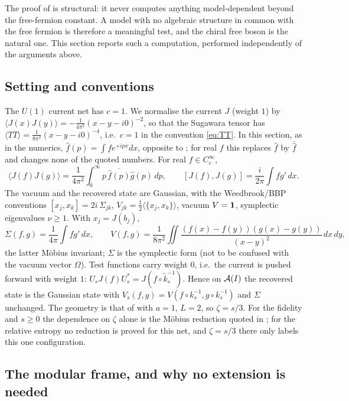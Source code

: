 The proof of  is structural: it never computes anything model-dependent beyond the free-fermion
constant.  A model with no algebraic structure in common with the free fermion is therefore a meaningful
test, and the chiral free boson is the natural one.  This section reports such a computation, performed
independently of the arguments above.

\subsection{Setting and conventions}

The $U(1)$ current net has $c=1$.  We normalise the current $J$ (weight $1$) by
$\langle J(x)J(y)\rangle=-\frac{1}{4\pi^{2}}(x-y-i0)^{-2}$, so that the Sugawara tensor has
$\langle TT\rangle=\frac{1}{8\pi^{2}}(x-y-i0)^{-4}$, i.e.\ $c=1$ in the convention \eqref{eq:TT}.  In this section, as in the numerics, $\hat f(p)=\int fe^{+ipx}dx$,
opposite to ; for real $f$ this replaces $\hat f$ by $\overline{\hat f}$ and changes none of the
quoted numbers.  For real
$f\in C_{c}^{\infty}$,
\[
 \langle J(f)J(g)\rangle=\frac{1}{4\pi^{2}}\int_{0}^{\infty}p\,\overline{\hat f(p)}\hat g(p)\,dp,
 \qquad [J(f),J(g)]=\frac{i}{2\pi}\int f g'\,dx .
\]
The vacuum and the recovered state are Gaussian, with the Weedbrook/BBP conventions
$[x_{j},x_{k}]=2i\,\Sigma_{jk}$, $V_{jk}=\frac12\langle\{x_{j},x_{k}\}\rangle$, vacuum $V=\mathbf 1$,
symplectic eigenvalues $\nu\ge1$.  With $x_{j}=J(b_{j})$,
\[
 \Sigma(f,g)=\frac{1}{4\pi}\int fg'\,dx,\qquad
 V(f,g)=\frac{1}{8\pi^{2}}\iint\frac{(f(x)-f(y))(g(x)-g(y))}{(x-y)^{2}}\,dx\,dy,
\]
the latter M\"obius invariant; $\Sigma$ is the symplectic form (not to be confused with the vacuum vector $\Omega$).  Test functions carry weight $0$, i.e.\ the current is pushed forward with
weight $1$: $U_{s}J(f)U_{s}^{*}=J(f\circ\tilde k_{s}^{-1})$.  Hence on $\mathcal A(I)$ the recovered state is the
Gaussian state with $V_{s}(f,g)=V(f\circ k_{s}^{-1},g\circ k_{s}^{-1})$ and $\Sigma$ unchanged.  The
geometry is that of  with $a=1$, $L=2$, so $\zeta=s/3$.  For the fidelity and $s\ge0$ the
dependence on $\zeta$ alone is the M\"obius reduction quoted in ; for the relative entropy no
reduction is proved for this net, and $\zeta=s/3$ there only labels this one configuration.

\subsection{The modular frame, and why no extension is needed}

